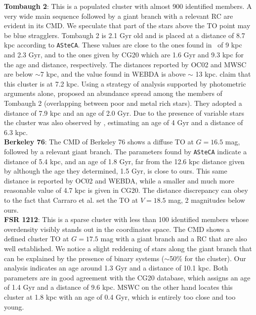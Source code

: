 \documentclass{aa}
\begin{document}
\begin{appendix}
  \noindent \textbf{Tombaugh 2}: This is a populated cluster with almost 900 identified
  members. A very wide main sequence followed by a giant branch with a relevant
  RC are evident in its CMD. We speculate that part of the stars
  above the TO point may be blue stragglers. Tombaugh 2 is 2.1 Gyr old and is
  placed at a distance of 8.7 kpc according to \texttt{ASteCA}. These values are
  close to the ones found in~\cite{Dias_2021} of 9 kpc and 2.3 Gyr, and
  to the ones given by CG20 which are 1.6 Gyr and 9.3 kpc for the age
  and distance, respectively. The distances reported by OC02 and MWSC are below
  $\sim$7 kpc, and the value found in WEBDA is above $\sim$ 13 kpc.
  \cite{Villanova_2010} claim that this cluster is at 7.2 kpc.
  Using a strategy of analysis supported by photometric arguments alone, 
  \cite{Frinchaboy_2008} proposed an abundance spread among the members of
  Tombaugh 2 (overlapping between poor and metal rich stars). They adopted a
  distance of 7.9 kpc and an age of 2.0 Gyr.
  Due to the presence of variable stars the cluster was also observed by
  \cite{Kubiak_1992}, estimating an age of 4 Gyr and a distance of 6.3 kpc.\\

  \noindent \textbf{Berkeley 76}: The CMD of Berkeley 76 shows a diffuse TO at $G=16.5$
  mag, followed by a relevant giant branch. The parameters found by
  \texttt{ASteCA} indicate a distance of 5.4 kpc, and an age of 1.8 Gyr, far
  from the 12.6 kpc distance given
  by \cite{Carraro_2013_Five} although the age they determined, 1.5 Gyr, is
  close to ours. This same distance is reported by OC02 and WEBDA, while a
  smaller and much more reasonable value of 4.7 kpc is given in CG20.
  The distance discrepancy can obey to the fact that Carraro et al. set
  the TO at $V=18.5$ mag, 2 magnitudes below ours.\\

  \noindent \textbf{FSR 1212}: This is a sparse cluster with less than 100 identified 
  members whose overdensity visibly stands out in the coordinates space. The CMD
  shows a defined cluster TO at $G=17.5$ mag with a giant branch and a RC that
  are also well established. We notice a slight reddening of stars along the
  giant branch that can be explained by the presence of binary systems 
  ($\sim$50\% for the cluster).
  Our analysis indicates an age around 1.3 Gyr and a distance of 10.1
  kpc. Both parameters are in good agreement with the CG20 database, which
  assigns an age of 1.4 Gyr and a distance of 9.6 kpc. MSWC on the other hand
  locates this cluster at 1.8 kpc with an age of 0.4 Gyr, which is entirely too
  close and too young.\\


\end{appendix}
\end{document}
